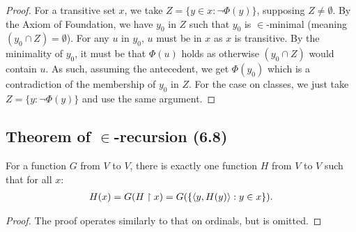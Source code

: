 \begin{proof}
    For a transitive set $x$, we take $Z = \{y \in x : \neg \Phi(y)\}$,
    supposing $Z \neq \emptyset$. By the Axiom of Foundation, we 
    have $y_0$ in $Z$ such that $y_0$ is $\in$-minimal
    (meaning $(y_0 \cap Z) = \emptyset$). For any $u$ in $y_0$,
    $u$ must be in $x$ as $x$ is transitive. By the minimality
    of $y_0$, it must be that $\Phi(u)$ holds as otherwise $(y_0 \cap Z)$
    would contain $u$. As such, assuming the antecedent, we get
    $\Phi(y_0)$ which is a contradiction of the membership of $y_0$
    in $Z$. For the case on classes, we just take $Z = \{y : \neg \Phi(y)\}$
    and use the same argument.
\end{proof}

\subsection{Theorem of $\in$-recursion (6.8)} \label{6.8}

For a function $G$ from $V$ to $V$, there is exactly one function
$H$ from $V$ to $V$ such that for all $x$: \begin{align*}
    H(x) = G(H \upharpoonright x) = G(\{{\langle y, H(y) \rangle} : y \in x\}).
\end{align*}

\begin{proof}
    The proof operates similarly to that on ordinals, but is omitted.
\end{proof}

